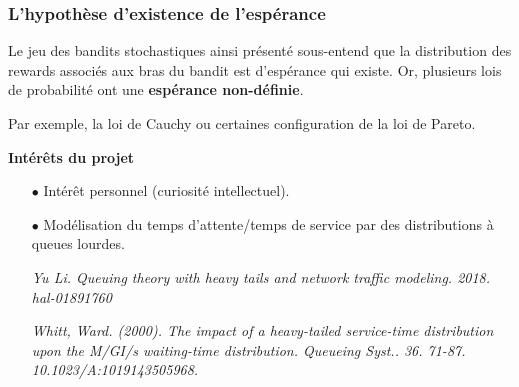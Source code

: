 \documentclass[8pt,sans,aspectratio=169]{beamer}
\begin{document}
\begin{frame}
\frametitle{L'hypothèse d'existence de l'espérance}
Le jeu des bandits stochastiques ainsi présenté sous-entend que la distribution des rewards associés aux bras du bandit est d'espérance qui existe. Or, plusieurs lois de probabilité ont une \textbf{espérance non-définie}. 

\pause
\vfill

Par exemple, la loi de Cauchy ou certaines configuration de la loi de Pareto.

\pause
\vfill

\textbf{Intérêts du projet}


\begin{itemize}
\item[$\bullet$]
Intérêt personnel (curiosité intellectuel).

\pause
\vfill

\item[$\bullet$]
Modélisation du temps d'attente/temps de service par des distributions à queues lourdes.

\pause
\vfill

{\it Yu Li. Queuing theory with heavy tails and network traffic modeling. 2018. hal-01891760}

\vfill

{\it Whitt, Ward. (2000). The impact of a heavy-tailed service-time distribution upon the M/GI/s waiting-time distribution. Queueing Syst.. 36. 71-87. 10.1023/A:1019143505968.}

\end{itemize}

\vfill

\end{frame}

%
%
%
%
%
\end{document}
